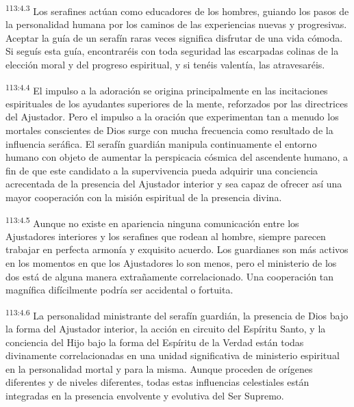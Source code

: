 \par
\textsuperscript{113:4.3} Los serafines actúan como educadores de los hombres, guiando los pasos de la personalidad humana por los caminos de las experiencias nuevas y progresivas. Aceptar la guía de un serafín raras veces significa disfrutar de una vida cómoda. Si seguís esta guía, encontraréis con toda seguridad las escarpadas colinas de la elección moral y del progreso espiritual, y si tenéis valentía, las atravesaréis.

\par
\textsuperscript{113:4.4} El impulso a la adoración se origina principalmente en las incitaciones espirituales de los ayudantes superiores de la mente, reforzados por las directrices del Ajustador. Pero el impulso a la oración que experimentan tan a menudo los mortales conscientes de Dios surge con mucha frecuencia como resultado de la influencia seráfica. El serafín guardián manipula continuamente el entorno humano con objeto de aumentar la perspicacia cósmica del ascendente humano, a fin de que este candidato a la supervivencia pueda adquirir una conciencia acrecentada de la presencia del Ajustador interior y sea capaz de ofrecer así una mayor cooperación con la misión espiritual de la presencia divina.

\par
\textsuperscript{113:4.5} Aunque no existe en apariencia ninguna comunicación entre los Ajustadores interiores y los serafines que rodean al hombre, siempre parecen trabajar en perfecta armonía y exquisito acuerdo. Los guardianes son más activos en los momentos en que los Ajustadores lo son menos, pero el ministerio de los dos está de alguna manera extrañamente correlacionado. Una cooperación tan magnífica difícilmente podría ser accidental o fortuita.

\par
\textsuperscript{113:4.6} La personalidad ministrante del serafín guardián, la presencia de Dios bajo la forma del Ajustador interior, la acción en circuito del Espíritu Santo, y la conciencia del Hijo bajo la forma del Espíritu de la Verdad están todas divinamente correlacionadas en una unidad significativa de ministerio espiritual en la personalidad mortal y para la misma. Aunque proceden de orígenes diferentes y de niveles diferentes, todas estas influencias celestiales están integradas en la presencia envolvente y evolutiva del Ser Supremo.

